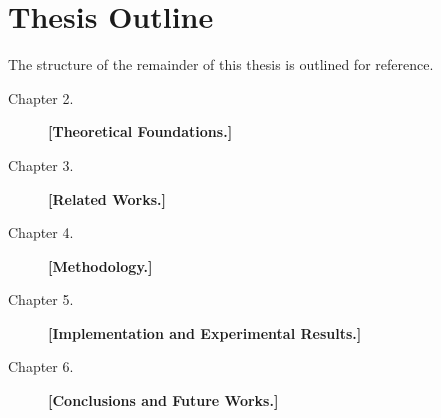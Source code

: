 \section{Thesis Outline}
\label{Sec:ThesisOutline}

The structure of the remainder of this thesis is outlined for reference.

\begin{description}
\item[Chapter 2.] \textbf{[Theoretical Foundations.]}
\item[Chapter 3.] \textbf{[Related Works.]}
\item[Chapter 4.] \textbf{[Methodology.]} 
\item[Chapter 5.] \textbf{[Implementation and Experimental Results.]}
\item[Chapter 6.] \textbf{[Conclusions and Future Works.]}
\end{description}
